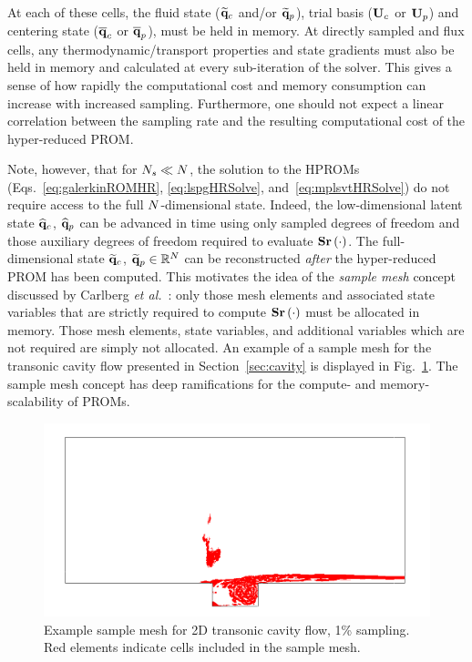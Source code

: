 At each of these cells, the fluid state ($\mathbf{\widetilde{q}}_{c}$ and/or $\mathbf{\widetilde{q}}_{p}$), trial basis ($\consTrial$ or $\primTrial$) and centering state ($\mathbf{\overline{q}}_{c}$ or $\mathbf{\overline{q}}_{p}$), must be held in memory. At directly sampled and flux cells, any thermodynamic/transport properties and state gradients must also be held in memory and calculated at every sub-iteration of the solver. This gives a sense of how rapidly the computational cost and memory consumption can increase with increased sampling. Furthermore, one should not expect a linear correlation between the sampling rate and the resulting computational cost of the hyper-reduced PROM.

Note, however, that for $N_s \ll N$, the solution to the HPROMs (Eqs.~\ref{eq:galerkinROMHR}, \ref{eq:lspgHRSolve}, and~\ref{eq:mplsvtHRSolve}) do not require access to the full $N$-dimensional state. Indeed, the low-dimensional latent state $\mathbf{\widehat{q}}_{c}$, $\mathbf{\widehat{q}}_{p}$ can be advanced in time using only sampled degrees of freedom and those auxiliary degrees of freedom required to evaluate $\mathbf{S} \mathbf{r}\left(\cdot\right)$. The full-dimensional state $\mathbf{\widetilde{q}}_{c}$, $\mathbf{\widetilde{q}}_{p} \in \mathbb{R}^{N}$ can be reconstructed \textit{after} the hyper-reduced PROM has been computed. This motivates the idea of the \textit{sample mesh} concept discussed by Carlberg \textit{et al.}~\cite{Carlberg2013}: only those mesh elements and associated state variables that are strictly required to compute $\mathbf{S} \mathbf{r}\left(\cdot\right)$ must be allocated in memory. Those mesh elements, state variables, and additional variables which are not required are simply not allocated. An example of a sample mesh for the transonic cavity flow presented in Section~\ref{sec:cavity} is displayed in Fig.~\ref{fig:sampMeshExample}. The sample mesh concept has deep ramifications for the compute- and memory-scalability of PROMs.

\begin{figure}
	\centering
	\includegraphics[width=0.75\linewidth]{Chapters/HPROMs/Images/cavity_sample_mesh.png}
	\caption{\label{fig:sampMeshExample}Example sample mesh for 2D transonic cavity flow, 1\% sampling. Red elements indicate cells included in the sample mesh.}
\end{figure}

